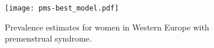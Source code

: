     \begin{figure}
        \begin{center}
            \texttt{[image: pms-best\_model.pdf]}
        \end{center}
        \caption{Prevalence estimates for women
          in Western Europe with premenstrual syndrome.}
        \label{fig:app-pms best}
    \end{figure}









